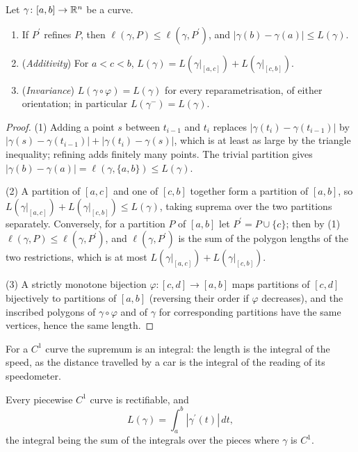 \begin{lemma}\label{real-analysis:lemma-length-basic}
Let $\gamma \colon [a, b] \to \mathbb{R}^n$ be a curve.
\begin{enumerate}
\item If $P^{\prime}$ refines $P$, then $\ell(\gamma, P) \leq \ell(\gamma, P^{\prime})$, and $|\gamma(b) - \gamma(a)| \leq L(\gamma)$.
\item (\emph{Additivity}) For $a < c < b$, $L(\gamma) = L(\gamma|_{[a, c]}) + L(\gamma|_{[c, b]})$.
\item (\emph{Invariance}) $L(\gamma \circ \varphi) = L(\gamma)$ for every reparametrisation, of either orientation; in particular $L(\gamma^-) = L(\gamma)$.
\end{enumerate}
\end{lemma}

\begin{proof}
(1) Adding a point $s$ between $t_{i-1}$ and $t_i$ replaces $|\gamma(t_i) - \gamma(t_{i-1})|$ by $|\gamma(s) - \gamma(t_{i-1})| + |\gamma(t_i) - \gamma(s)|$, which is at least as large by the triangle inequality;
refining adds finitely many points. The trivial partition gives $|\gamma(b) - \gamma(a)| = \ell(\gamma, \{a, b\}) \leq L(\gamma)$.

(2) A partition of $[a, c]$ and one of $[c, b]$ together form a partition of $[a, b]$, so $L(\gamma|_{[a, c]}) + L(\gamma|_{[c, b]}) \leq L(\gamma)$, taking suprema over the two partitions separately.
Conversely, for a partition $P$ of $[a, b]$ let $P^{\prime} = P \cup \{c\}$; then by (1) $\ell(\gamma, P) \leq \ell(\gamma, P^{\prime})$, and $\ell(\gamma, P^{\prime})$ is the sum of the polygon lengths of the two restrictions,
which is at most $L(\gamma|_{[a, c]}) + L(\gamma|_{[c, b]})$.

(3) A strictly monotone bijection $\varphi \colon [c, d] \to [a, b]$ maps partitions of $[c, d]$ bijectively to partitions of $[a, b]$ (reversing their order if $\varphi$ decreases), and the inscribed polygons of
$\gamma \circ \varphi$ and of $\gamma$ for corresponding partitions have the same vertices, hence the same length.
\end{proof}

For a $C^1$ curve the supremum is an integral: the length is the integral of the speed, as the distance travelled by a car is the integral of the reading of its speedometer.

\begin{theorem}\label{real-analysis:theorem-length-integral}
Every piecewise $C^1$ curve is rectifiable, and
\[
L(\gamma) = \int_a^b|\gamma^{\prime}(t)|\,dt,
\]
the integral being the sum of the integrals over the pieces where $\gamma$ is $C^1$.
\end{theorem}

